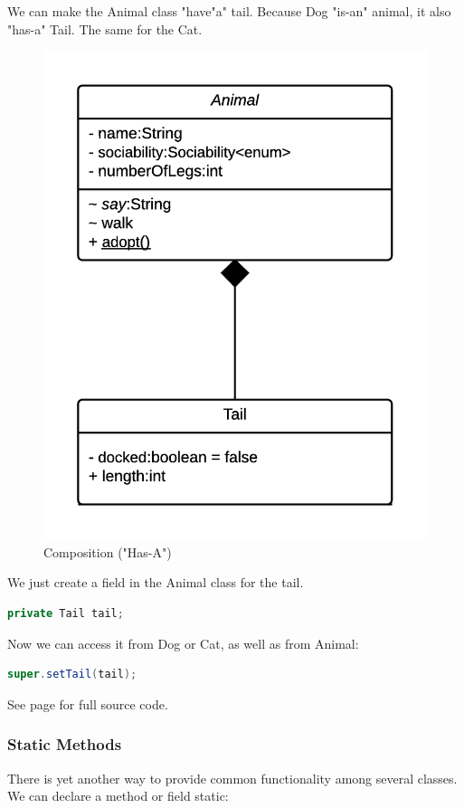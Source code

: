 We can make the Animal class "have"a" tail. Because Dog "is-an" animal, it also "has-a" Tail. The same for the Cat.
\begin{figure}[H]\centering %
\includegraphics[width=0.9\linewidth, frame]{images/composition}
\caption{Composition ("Has-A")}
\label{fig:composition}
\end{figure}

We just create a field in the Animal class for the tail.
\begin{lstlisting}[language=Java]
private Tail tail;
\end{lstlisting}

Now we can access it from Dog or Cat, as well as from Animal:
\begin{lstlisting}[language=Java]
super.setTail(tail);
\end{lstlisting}

See page \pageref{App:AppendixJComposition} for full source code.

\subsubsection{Static Methods}
There is yet another way to provide common functionality among several classes. We can declare a method or field static:

